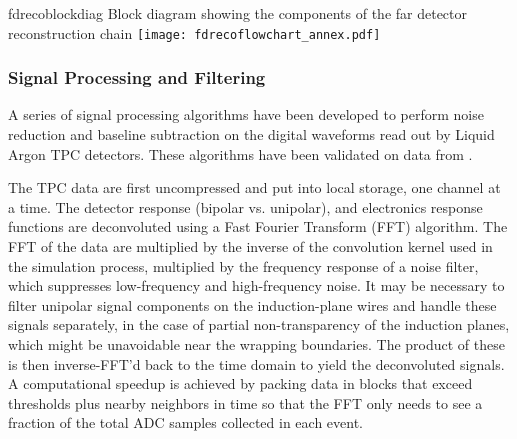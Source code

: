 \begin{cdrfigure}{fdrecoblockdiag}
{Block diagram showing the components of the far detector reconstruction chain}
\texttt{[image: fdrecoflowchart\_annex.pdf]}
\end{cdrfigure}


\subsubsection{Signal Processing and Filtering}

A series of signal processing algorithms have been developed to
perform noise reduction and baseline subtraction on the digital
waveforms read out by Liquid Argon TPC detectors. 
These algorithms have been validated on data from 
.

The TPC data are first uncompressed and put into local storage, one
channel at a time.  
The detector response (bipolar vs. unipolar), and
electronics response functions are deconvoluted using a Fast Fourier
Transform (FFT) algorithm.  The FFT of the data are multiplied by the
inverse of the convolution kernel used in the simulation process,
multiplied by the frequency response of a noise filter, which
suppresses low-frequency and high-frequency noise.  It may be
necessary to filter unipolar signal components on the induction-plane
wires and handle these signals separately, in the case of partial
non-transparency of the induction planes, which might be unavoidable
near the wrapping boundaries.  The product of these is then
inverse-FFT'd back to the time domain to yield the deconvoluted
signals.  A computational speedup is achieved by packing data in
blocks that exceed thresholds plus nearby neighbors in time so that
the FFT only needs to see a fraction of the total ADC samples
collected in each event.

